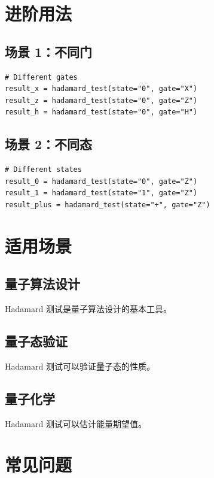\documentclass[12pt,a4paper]{article}
\begin{document}
\section{进阶用法}

\subsection{场景 1：不同门}

\begin{lstlisting}[style=python]
# Different gates
result_x = hadamard_test(state="0", gate="X")
result_z = hadamard_test(state="0", gate="Z")
result_h = hadamard_test(state="0", gate="H")
\end{lstlisting}

\subsection{场景 2：不同态}

\begin{lstlisting}[style=python]
# Different states
result_0 = hadamard_test(state="0", gate="Z")
result_1 = hadamard_test(state="1", gate="Z")
result_plus = hadamard_test(state="+", gate="Z")
\end{lstlisting}

\section{适用场景}

\subsection{量子算法设计}

Hadamard 测试是量子算法设计的基本工具。

\subsection{量子态验证}

Hadamard 测试可以验证量子态的性质。

\subsection{量子化学}

Hadamard 测试可以估计能量期望值。

\section{常见问题}
\end{document}
